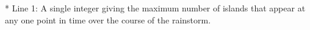 * Line 1: A single integer giving the maximum number of islands that         appear at any one point in time over the course of the         rainstorm.